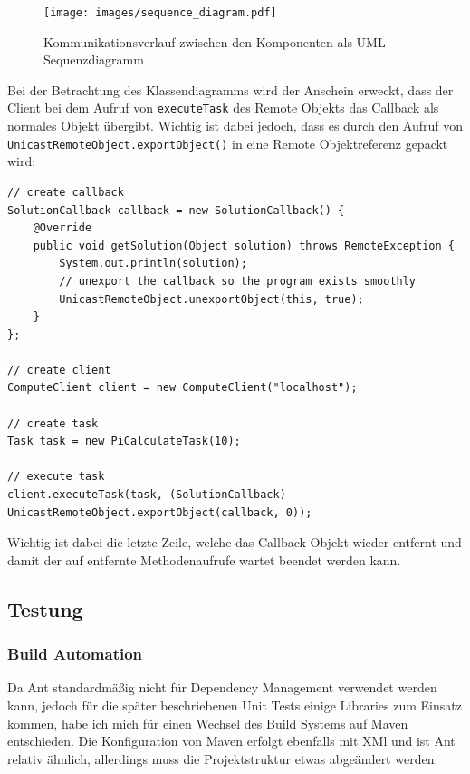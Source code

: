 \begin{figure}[H]
	\begin{center}
		\texttt{[image: images/sequence\_diagram.pdf]}
		\caption{Kommunikationsverlauf zwischen den Komponenten als UML Sequenzdiagramm}
		\label{broker}
	\end{center}
\end{figure}

Bei der Betrachtung des Klassendiagramms wird der Anschein erweckt, dass der Client bei dem Aufruf von \texttt{executeTask} des Remote Objekts das Callback als normales Objekt \"ubergibt.
Wichtig ist dabei jedoch, dass es durch den Aufruf von \texttt{UnicastRemoteObject.exportObject()} in eine Remote Objektreferenz gepackt wird:

\begin{lstlisting}[style=Java, caption=Beispielcode zur asynchronen Ausf\"uhrung einer Berechnung]
// create callback
SolutionCallback callback = new SolutionCallback() {
    @Override
    public void getSolution(Object solution) throws RemoteException {
        System.out.println(solution);
        // unexport the callback so the program exists smoothly
        UnicastRemoteObject.unexportObject(this, true);
    }
};

// create client
ComputeClient client = new ComputeClient("localhost");

// create task
Task task = new PiCalculateTask(10);

// execute task
client.executeTask(task, (SolutionCallback) UnicastRemoteObject.exportObject(callback, 0));
\end{lstlisting}

Wichtig ist dabei die letzte Zeile, welche das Callback Objekt wieder entfernt und damit der auf entfernte Methodenaufrufe wartet beendet werden kann.


\subsection{Testung}
\subsubsection{Build Automation}
Da Ant standardm\"a\ss ig nicht f\"ur Dependency Management verwendet werden kann, jedoch f\"ur die sp\"ater beschriebenen Unit Tests einige Libraries zum Einsatz kommen, habe ich mich f\"ur einen Wechsel des Build Systems auf Maven entschieden.
Die Konfiguration von Maven erfolgt ebenfalls mit XMl und ist Ant relativ \"ahnlich, allerdings muss die Projektstruktur etwas abge\"andert werden:

